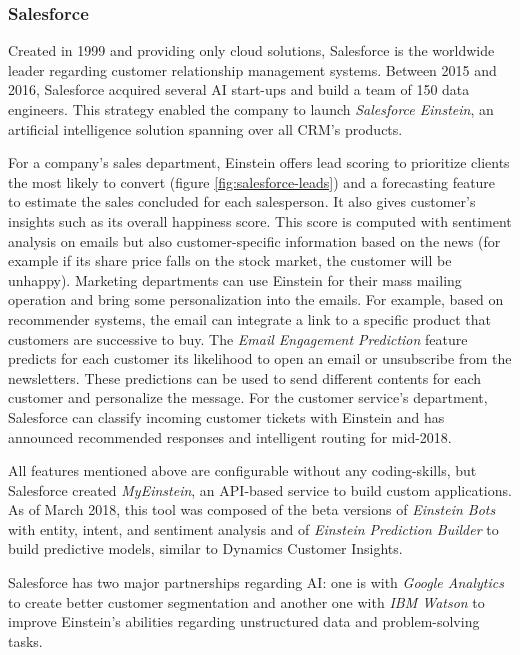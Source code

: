 \subsubsection*{Salesforce}
Created in 1999 and providing only cloud solutions, Salesforce is the worldwide leader regarding customer relationship management systems. Between 2015 and 2016, Salesforce acquired several AI start-ups and build a team of 150 data engineers. This strategy enabled the company to launch \textit{Salesforce Einstein}, an artificial intelligence solution spanning over all CRM's products.

For a company's sales department, Einstein offers lead scoring to prioritize clients the most likely to convert (figure \ref{fig:salesforce-leads}) and a forecasting feature to estimate the sales concluded for each salesperson. It also gives customer's insights such as its overall happiness score. This score is computed with sentiment analysis on emails but also customer-specific information based on the news (for example if its share price falls on the stock market, the customer will be unhappy). Marketing departments can use Einstein for their mass mailing operation and bring some personalization into the emails. For example, based on recommender systems, the email can integrate a link to a specific product that customers are successive to buy. The \textit{Email Engagement Prediction} feature predicts for each customer its likelihood to open an email or unsubscribe from the newsletters. These predictions can be used to send different contents for each customer and personalize the message. For the customer service's department, Salesforce can classify incoming customer tickets with Einstein and has announced recommended responses and intelligent routing for mid-2018.

All features mentioned above are configurable without any coding-skills, but Salesforce created \textit{MyEinstein}, an API-based service to build custom applications. As of March 2018, this tool was composed of the beta versions of \textit{Einstein Bots} with entity, intent, and sentiment analysis and of \textit{Einstein Prediction Builder} to build predictive models, similar to Dynamics Customer Insights.

Salesforce has two major partnerships regarding AI: one is with \textit{Google Analytics} to create better customer segmentation and another one with \textit{IBM Watson} to improve Einstein's abilities regarding unstructured data and problem-solving tasks.

